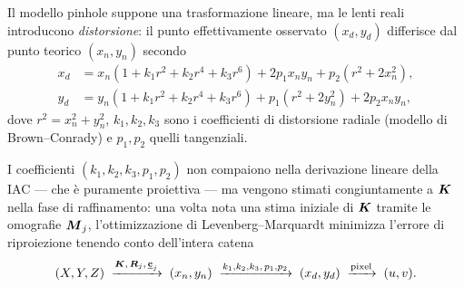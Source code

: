 Il modello pinhole suppone una trasformazione lineare, ma le lenti reali
introducono \emph{distorsione}: il punto effettivamente osservato
\((x_d,y_d)\) differisce dal punto teorico \((x_n,y_n)\) secondo
\begin{align}
  x_d &= x_n(1+k_1r^2+k_2r^4+k_3r^6)
        +2p_1x_ny_n+p_2(r^2+2x_n^2),\\
  y_d &= y_n(1+k_1r^2+k_2r^4+k_3r^6)
        +p_1(r^2+2y_n^2)+2p_2x_ny_n,
\end{align}
dove \(r^2=x_n^2+y_n^2\), \(k_1,k_2,k_3\) sono i coefficienti di
distorsione radiale (modello di Brown--Conrady) e
\(p_1,p_2\) quelli tangenziali.

I coefficienti \((k_1,k_2,k_3,p_1,p_2)\) non compaiono nella derivazione
lineare della IAC --- che è puramente proiettiva --- ma vengono stimati
congiuntamente a \(\boldsymbol{K}\) nella fase di raffinamento: una volta nota
una stima iniziale di \(\boldsymbol{K}\) tramite le omografie \(\boldsymbol{M}_j\),
l'ottimizzazione di Levenberg--Marquardt minimizza l'errore di
riproiezione tenendo conto dell'intera catena
\[
  (X,Y,Z) \;\xrightarrow{\boldsymbol{K},\,\boldsymbol{R}_j,\,\underline{\mathbf{c}}_j}\;
  (x_n, y_n) \;\xrightarrow{k_1,k_2,k_3,\,p_1,p_2}\;
  (x_d, y_d) \;\xrightarrow{\text{pixel}}\; (u,v).
\]
